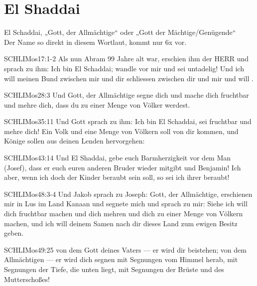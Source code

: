 \section{El Shaddai}
\begin{otsblock}[Gottesnamen]
     El Schaddai, „Gott, der Allmächtige“ oder „Gott der Mächtige/Genügende“\\
    Der Name so direkt in diesem Wortlaut, kommt nur  6x vor.

    \begin{bibelbox}{SCHL}{IMos}{17:1-2}
        Als nun Abram 99 Jahre alt war, erschien ihm der HERR und sprach zu ihm: Ich bin El Schaddai; wandle vor mir und sei untadelig! Und ich will meinen Bund zwischen mir und dir schliessen zwischen dir und mir und will .
    \end{bibelbox}
    \begin{bibelbox}{SCHL}{IMos}{28:3}
        Und Gott, der Allmächtige segne dich und mache dich fruchtbar und mehre dich, dass du zu einer Menge von Völker werdest.
    \end{bibelbox}
    \begin{bibelbox}{SCHL}{IMos}{35:11}
        Und Gott sprach zu ihm: Ich bin El Schaddai, sei fruchtbar und mehre dich! Ein Volk und eine Menge von Völkern soll von dir kommen, und Könige sollen aus deinen Lenden hervorgehen:
    \end{bibelbox}
    \begin{bibelbox}{SCHL}{IMos}{43:14}
        Und El Shaddai, gebe euch Barmherzigkeit vor dem Man (Josef), dass er euch euren anderen Bruder wieder mitgibt und Benjamin! Ich aber, wenn ich doch der Kinder beraubt sein soll, so sei ich ihrer beraubt!
    \end{bibelbox}
    \begin{bibelbox}{SCHL}{IMos}{48:3-4}
        Und Jakob sprach zu Joseph: Gott, der Allmächtige, erschienen mir in Lus im Land Kanaan und segnete mich und sprach zu mir: Siehe ich will dich fruchtbar machen und dich mehren  und dich zu einer Menge von Völkern machen, und ich will deinem Samen nach dir dieses Land zum ewigen Besitz geben.
    \end{bibelbox}
    \begin{bibelbox}{SCHL}{IMos}{49:25}
        von dem Gott deines Vaters — er wird dir beistehen; von dem Allmächtigen — er wird dich segnen mit Segnungen vom Himmel herab, mit Segnungen der Tiefe, die unten liegt, mit Segnungen der Brüste und des Mutterschoßes!
    \end{bibelbox}
    

\end{otsblock}
